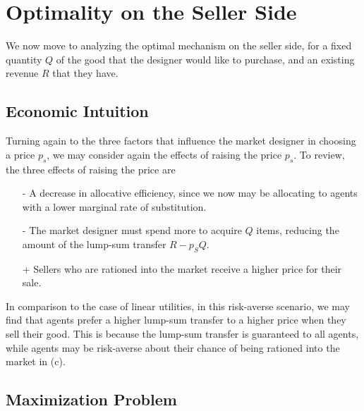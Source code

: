 \documentclass[AER]{AEA}
\begin{document}

\section{Optimality on the Seller Side}

We now move to analyzing the optimal mechanism on the seller side, for a fixed quantity $Q$ of the good that the designer would like to purchase, and an existing revenue $R$ that they have.

\subsection{Economic Intuition}
\label{sec:economic-intuition}

Turning again to the three factors that influence the market designer in choosing a price $p_s$, we may consider again the effects of raising the price $p_s$. To review, the three effects of raising the price are

\begin{enumerate}[(a)]
    \item [-] A decrease in allocative efficiency, since we now may be allocating to agents with a lower marginal rate of substitution. 
    \item [-] The market designer must spend more to acquire $Q$ items, reducing the amount of the lump-sum transfer $R - p_SQ$.
    \item [+] Sellers who are rationed into the market receive a higher price for their sale.
\end{enumerate}

In comparison to the case of linear utilities, in this risk-averse scenario, we may find that agents prefer a higher lump-sum transfer to a higher price when they sell their good. This is because the lump-sum transfer is guaranteed to all agents, while agents may be risk-averse about their chance of being rationed into the market in (c).


\subsection{Maximization Problem}
\end{document}
